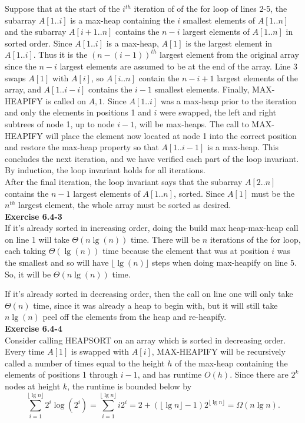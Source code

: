 \documentclass{article}
\begin{document}
Suppose that at the start of the $i^{th}$ iteration of of the for loop of lines 2-5, the subarray $A[1..i]$ is a max-heap containing the $i$ smallest elements of $A[1..n]$ and the subarray $A[i+1..n]$ contains the $n-i$ largest elements of $A[1..n]$ in sorted order. Since $A[1..i]$ is a max-heap, $A[1]$ is the largest element in $A[1..i]$. Thus it is the $(n-(i-1))^{th}$ largest element from the original array since the $n-i$ largest elements are assumed to be at the end of the array.  Line 3 swaps $A[1]$ with $A[i]$, so $A[i..n]$ contain the $n-i+1$ largest elements of the array, and $A[1..i-i]$ contains the $i-1$ smallest elements.  Finally, MAX-HEAPIFY is called on $A,1$.  Since $A[1..i]$ was a max-heap prior to the iteration and only the elements in positions 1 and $i$ were swapped, the left and right subtrees of node 1, up to node $i-1$, will be max-heaps.  The call to MAX-HEAPIFY will place the element now located at node 1 into the correct position and restore the max-heap property so that $A[1..i-1]$ is a max-heap.  This concludes the next iteration, and we have verified each part of the loop invariant.  By induction, the loop invariant holds for all iterations.\\

After the final iteration, the loop invariant says that the subarray $A[2..n]$ contains the $n-1$ largest elements of $A[1..n]$, sorted.  Since $A[1]$ must be the $n^{th}$ largest element, the whole array must be sorted as desired. \\

\noindent\textbf{Exercise 6.4-3}\\

If it's already sorted in increasing order, doing the build max heap-max-heap call on line 1 will take $\Theta(n\lg(n))$ time. There will be $n$ iterations of the for loop, each taking $\Theta(\lg(n))$ time because the element that was at position $i$ was the smallest and so will have $\lfloor \lg(n)\rfloor$ steps when doing max-heapify on line 5. So, it will be $\Theta(n\lg(n))$ time.

If it's already sorted in decreasing order, then the call on line one will only take $\Theta(n)$ time, since it was already a heap to begin with, but it will still take $n\lg(n)$ peel off the elements from the heap and re-heapify. \\

\noindent\textbf{Exercise 6.4-4}\\

Consider calling HEAPSORT on an array which is sorted in decreasing order.  Every time $A[1]$ is swapped with $A[i]$, MAX-HEAPIFY will be recursively called a number of times equal to the height $h$ of the max-heap containing the elements of positions 1 through $i-1$, and has runtime $O(h)$.  Since there are $2^k$ nodes at height $k$, the runtime is bounded below by
\[ \sum_{i=1}^{\lfloor\lg n\rfloor} 2^i \log(2^i) =  \sum_{i=1}^{\lfloor\lg n\rfloor} i2^i = 2 + (\lfloor\lg n\rfloor - 1)2^{\lfloor\lg n\rfloor} = \Omega(n\lg n).\]
\end{document}
